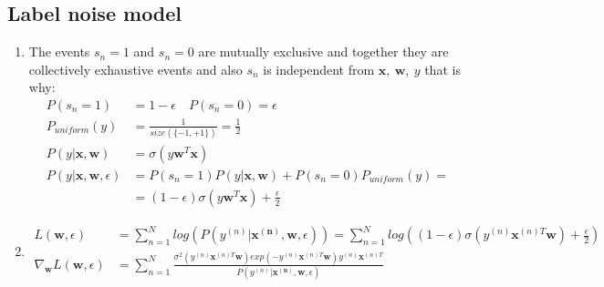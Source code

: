 \documentclass{article}
\newcommand{\vect}[1]{\boldsymbol{#1}} %
\begin{document}
			\subsection{Label noise model}
				\begin{enumerate}[label=(\alph*)]
					\item 
						The events $s_{n}=1$ and $s_{n}=0$ are mutually exclusive and together they are collectively exhaustive events and also  $s_{n}$ is independent from $\vect{x},\ \vect{w},\ y$ that is why:
						\begin{align*}
							P(s_{n}=1) &= 1 - \epsilon \quad P(s_{n}=0)=\epsilon\\
							P_{uniform}(y) &= \frac{1}{size(\{-1, +1\})}=\frac{1}{2}\\
							P(y|\vect{x},\vect{w}) &= \sigma(y\vect{w}^{T}\vect{x})\\
							P(y|\vect{x}, \vect{w}, \epsilon) &= P(s_{n}=1)P(y|\vect{x},\vect{w}) + P(s_{n}=0)P_{uniform}(y)=\\
							&=(1-\epsilon)\sigma(y\vect{w}^{T}\vect{x}) + \frac{\epsilon}{2}
						\end{align*}
					
					\item
						\begin{align*}
							L(\vect{w}, \epsilon) &= \sum_{n=1}^{N}log(P(y^{(n)}|\vect{x^{(n)}}, \vect{w}, \epsilon)) = 
							 \sum_{n=1}^{N}log((1-\epsilon)\sigma(y^{(n)}\vect{x}^{(n)T}\vect{w}) + \frac{\epsilon}{2})  \\
							\nabla_{\vect{w}}L(\vect{w}, \epsilon) &= \sum_{n=1}^{N}\frac{\sigma^2(y^{(n)}\vect{x}^{(n)T}\vect{w}) exp(-y^{(n)}\vect{x}^{(n)T}\vect{w}) y^{(n)}\vect{x}^{(n)T}} {P(y^{(n)}|\vect{x^{(n)}}, \vect{w}, \epsilon)}
						\end{align*}
				\end{enumerate}
				
				
\end{document}
